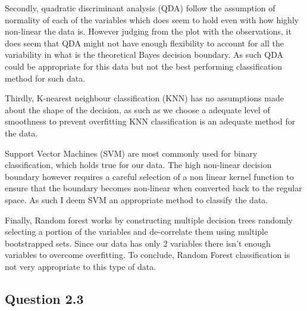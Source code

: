 \documentclass[
  letterpaper,
  DIV=11,
  numbers=noendperiod]{scrartcl}
\begin{document}
Secondly, quadratic discriminant analysis (QDA) follow the assumption of
normality of each of the variables which does seem to hold even with how
highly non-linear the data is. However judging from the plot with the
observations, it does seem that QDA might not have enough flexibility to
account for all the variability in what is the theoretical Bayes
decision boundary. As such QDA could be appropriate for this data but
not the best performing classification method for such data.

Thirdly, K-nearest neighbour classification (KNN) has no assumptions
made about the shape of the decision, as such as we choose a adequate
level of smoothness to prevent overfitting KNN classification is an
adequate method for the data.

Support Vector Machines (SVM) are most commonly used for binary
classification, which holds true for our data. The high non-linear
decision boundary however requires a careful selection of a non linear
kernel function to ensure that the boundary becomes non-linear when
converted back to the regular space. As such I deem SVM an appropriate
method to classify the data.

Finally, Random forest works by constructing multiple decision trees
randomly selecting a portion of the variables and de-correlate them
using multiple bootstrapped sets. Since our data has only 2 variables
there isn't enough variables to overcome overfitting. To conclude,
Random Forest classification is not very appropriate to this type of
data.

\hypertarget{question-2.3}{%
\subsection{Question 2.3}\label{question-2.3}}
\end{document}
